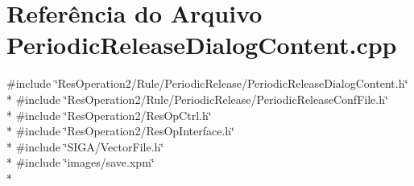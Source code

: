 \section{Referência do Arquivo Periodic\+Release\+Dialog\+Content.\+cpp}
\label{_2_rule_2_periodic_release_2_periodic_release_dialog_content_8cpp}
{\ttfamily \#include \char`\"{}Res\+Operation2/\+Rule/\+Periodic\+Release/\+Periodic\+Release\+Dialog\+Content.\+h\char`\"{}}\\*
{\ttfamily \#include \char`\"{}Res\+Operation2/\+Rule/\+Periodic\+Release/\+Periodic\+Release\+Conf\+File.\+h\char`\"{}}\\*
{\ttfamily \#include \char`\"{}Res\+Operation2/\+Res\+Op\+Ctrl.\+h\char`\"{}}\\*
{\ttfamily \#include \char`\"{}Res\+Operation2/\+Res\+Op\+Interface.\+h\char`\"{}}\\*
{\ttfamily \#include \char`\"{}S\+I\+G\+A/\+Vector\+File.\+h\char`\"{}}\\*
{\ttfamily \#include \char`\"{}images/save.\+xpm\char`\"{}}\\*
